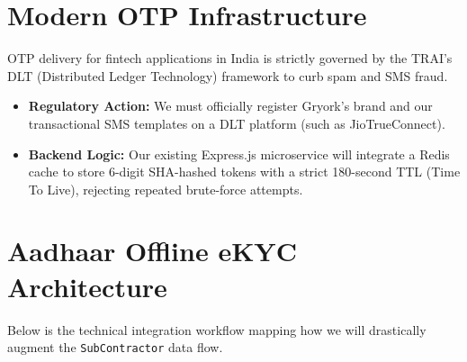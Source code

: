\documentclass[11pt, a4paper]{report}
\begin{document}
\section{Modern OTP Infrastructure}
OTP delivery for fintech applications in India is strictly governed by the TRAI's DLT (Distributed Ledger Technology) framework to curb spam and SMS fraud. 
\begin{itemize}[itemsep=0.3em]
    \item \textbf{Regulatory Action:} We must officially register Gryork's brand and our transactional SMS templates on a DLT platform (such as JioTrueConnect).
    \item \textbf{Backend Logic:} Our existing Express.js microservice will integrate a Redis cache to store 6-digit SHA-hashed tokens with a strict 180-second TTL (Time To Live), rejecting repeated brute-force attempts.
\end{itemize}

\section{Aadhaar Offline eKYC Architecture}
Below is the technical integration workflow mapping how we will drastically augment the \texttt{SubContractor} data flow.
\end{document}
